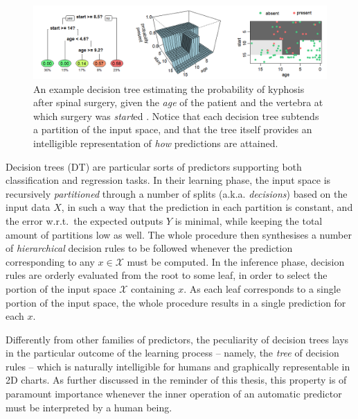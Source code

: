 \documentclass[12pt,a4paper,openright,twoside]{book}
\begin{document}
\begin{figure}
    \centering
    \includegraphics[width=\linewidth]{figures/dt-kyphosis.png}
    \caption[An example decision tree estimating the probability of kyphosis after spinal surgery]{An example decision tree estimating the probability of kyphosis after spinal surgery, given the \emph{age} of the patient and the vertebra at which surgery was \emph{start}ed \cite{wiki:dt-learning}. Notice that each decision tree subtends a partition of the input space, and that the tree itself provides an intelligible representation of \emph{how} predictions are attained.}
    \label{fig:dt-example}
\end{figure}

Decision trees (DT) are particular sorts of predictors supporting both classification and regression tasks.
%
In their learning phase, the input space is recursively \emph{partitioned} through a number of splits (a.k.a. \emph{decisions}) based on the input data $X$, in such a way that the prediction in each partition is constant, and the error w.r.t.\ the expected outputs $Y$ is minimal, while keeping the total amount of partitions low as well.
%
The whole procedure then synthesises a number of \emph{hierarchical} decision rules to be followed whenever the prediction corresponding to any $x \in \mathcal{X}$ must be computed.
%
In the inference phase, decision rules are orderly evaluated from the root to some leaf, in order to select the portion of the input space  $\mathcal{X}$ containing $x$.
%
As each leaf corresponds to a single portion of the input space, the whole procedure results in a single prediction for each $x$.

Differently from other families of predictors, the peculiarity of decision trees lays in the particular outcome of the learning process -- namely, the \emph{tree} of decision rules -- which is naturally intelligible for humans and graphically representable in 2D charts.
%
As further discussed in the reminder of this thesis, this property is of paramount importance whenever the inner operation of an automatic predictor must be interpreted by a human being.
\end{document}
